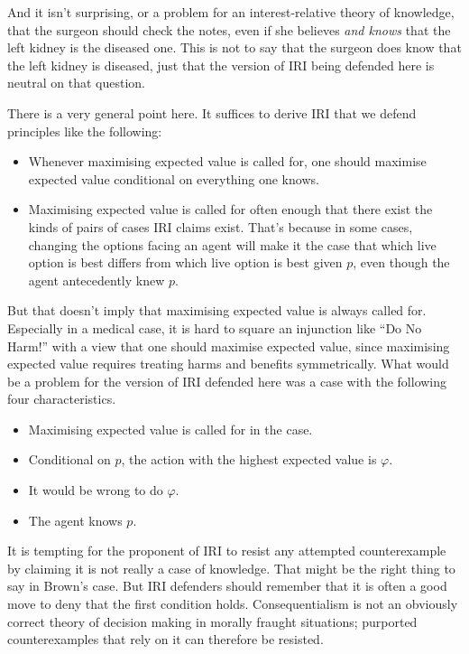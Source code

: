 \documentclass[
  11pt,
  letterpaper,
  DIV=11,
  numbers=noendperiod,
  oneside]{scrartcl}
\providecommand{\tightlist}{%
  \setlength{\itemsep}{0pt}\setlength{\parskip}{0pt}}\usepackage{longtable,booktabs,array}
\begin{document}
And it isn't surprising, or a problem for an interest-relative theory of
knowledge, that the surgeon should check the notes, even if she believes
\emph{and knows} that the left kidney is the diseased one. This is not
to say that the surgeon does know that the left kidney is diseased, just
that the version of IRI being defended here is neutral on that question.

There is a very general point here. It suffices to derive IRI that we
defend principles like the following:

\begin{itemize}
\tightlist
\item
  Whenever maximising expected value is called for, one should maximise
  expected value conditional on everything one knows.
\item
  Maximising expected value is called for often enough that there exist
  the kinds of pairs of cases IRI claims exist. That's because in some
  cases, changing the options facing an agent will make it the case that
  which live option is best differs from which live option is best given
  \(p\), even though the agent antecedently knew \(p\).
\end{itemize}

But that doesn't imply that maximising expected value is always called
for. Especially in a medical case, it is hard to square an injunction
like ``Do No Harm!'' with a view that one should maximise expected
value, since maximising expected value requires treating harms and
benefits symmetrically. What would be a problem for the version of IRI
defended here was a case with the following four characteristics.

\begin{itemize}
\tightlist
\item
  Maximising expected value is called for in the case.
\item
  Conditional on \(p\), the action with the highest expected value is
  \(\varphi\).
\item
  It would be wrong to do \(\varphi\).
\item
  The agent knows \(p\).
\end{itemize}

It is tempting for the proponent of IRI to resist any attempted
counterexample by claiming it is not really a case of knowledge. That
might be the right thing to say in Brown's case. But IRI defenders
should remember that it is often a good move to deny that the first
condition holds. Consequentialism is not an obviously correct theory of
decision making in morally fraught situations; purported counterexamples
that rely on it can therefore be resisted.
\end{document}

